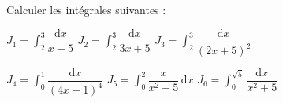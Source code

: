 
\begin{exercice}\label{exoautoanalyseCTU-22}


Calculer les intégrales suivantes : 

$J_{1}=\displaystyle\int_{2}^{3}\dfrac{\mathrm dx}{x+5}$  \hfill$J_{2}=\displaystyle\int_{2}^{3}\dfrac{\mathrm dx}{3x+5}$ \hfill$J_{3}=\displaystyle\int_{2}^{3}\dfrac{\mathrm dx}{(2x+5)^2}$

$J_{4}=\displaystyle\int_{0}^{1}\dfrac{\mathrm dx}{(4x+1)^4}$\hfill
$J_{5}=\displaystyle\int_{0}^{2}\dfrac{x}{x^2+5}\,\mathrm dx$ \hfill$J_{6}=\displaystyle\int_{0}^{\sqrt{5}}\dfrac{\mathrm dx}{x^2+5}$ \hspace{2 cm}







\end{exercice}
